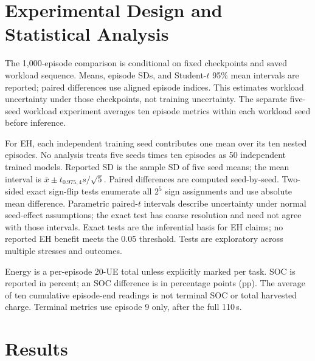 \documentclass[conference]{IEEEtran}
\begin{document}
\section{Experimental Design and Statistical Analysis}
The 1,000-episode comparison is conditional on fixed checkpoints and saved workload sequence. Means, episode SDs, and Student-$t$ 95\% mean intervals are reported; paired differences use aligned episode indices. This estimates workload uncertainty under those checkpoints, not training uncertainty. The separate five-seed workload experiment averages ten episode metrics within each workload seed before inference.

For EH, each independent training seed contributes one mean over its ten nested episodes. No analysis treats five seeds times ten episodes as 50 independent trained models. Reported SD is the sample SD of five seed means; the mean interval is $\bar x\pm t_{0.975,4}s/\sqrt5$. Paired differences are computed seed-by-seed. Two-sided exact sign-flip tests enumerate all $2^5$ sign assignments and use absolute mean difference. Parametric paired-$t$ intervals describe uncertainty under normal seed-effect assumptions; the exact test has coarse resolution and need not agree with those intervals. Exact tests are the inferential basis for EH claims; no reported EH benefit meets the 0.05 threshold. Tests are exploratory across multiple stresses and outcomes.

Energy is a per-episode 20-UE total unless explicitly marked per task. SOC is reported in percent; an SOC difference is in percentage points (pp). The average of ten cumulative episode-end readings is not terminal SOC or total harvested charge. Terminal metrics use episode 9 only, after the full 110\,s.

\section{Results}
\end{document}
